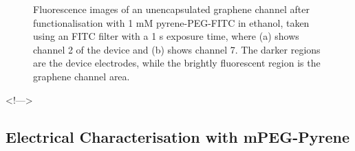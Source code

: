 \documentclass[
  a4paper,
]{scrbook}
\begin{document}
\begin{figure}
\begin{minipage}[t]{0.47\linewidth}
{{}

}

\subcaption{\label{fig-FITC-EtOH-ch7}}
\end{minipage}%

\caption{\label{fig-FITC-EtOH}Fluorescence images of an unencapsulated
graphene channel after functionalisation with 1 mM pyrene-PEG-FITC in
ethanol, taken using an FITC filter with a 1 s exposure time, where (a)
shows channel 2 of the device and (b) shows channel 7. The darker
regions are the device electrodes, while the brightly fluorescent region
is the graphene channel area.}

\end{figure}

\textless!---\textgreater{}

\hypertarget{electrical-characterisation-with-mpeg-pyrene}{%
\subsection{Electrical Characterisation with
mPEG-Pyrene}\label{electrical-characterisation-with-mpeg-pyrene}}
\end{document}
